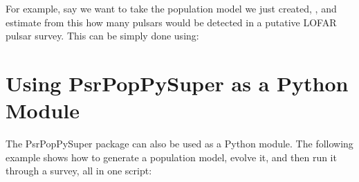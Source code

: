 \documentclass[letterpaper,10pt,english]{sphinxmanual}
\begin{document}
\sphinxAtStartPar
For example, say we want to take the population model we just created,
, and estimate from this how many pulsars would be detected
in a putative LOFAR pulsar survey. This can be simply done using:

\begin{sphinxVerbatim}[commandchars=\\\{\}]
    
\end{sphinxVerbatim}


\section{Using PsrPopPySuper as a Python Module}
\label{\detokenize{tutorial-basic:using-psrpoppysuper-as-a-python-module}}
\sphinxAtStartPar
The PsrPopPySuper package can also be used as a Python module. The
following example shows how to generate a population model, evolve it, and
then run it through a survey, all in one script:
\end{document}
